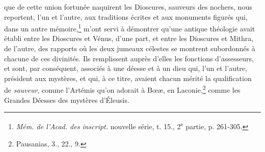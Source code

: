 \documentclass{article}
\begin{document}
que de cette union fortunée naquirent les Dioscures, sauveurs des nochers, nous reportent, l'un et l'autre, aux traditions écrites et aux monuments figurés qui, dans un autre mémoire,\footnote{\emph{Mém. de l'Acad. des inscript.} nouvelle série, t. 15., 2\textsuperscript{e} partie, p. 261-305.} m'ont servi à démontrer qu'une antique théologie avait établi entre les Dioscures et Vénus, d'une part, et entre les Dioscures et Mithra, de l'autre, des rapports où les deux jumeaux célestes se montrent subordonnés à chacune de ces divinités. Ils remplissent auprès d'elles les fonctions d'assesseurs, et sont, par conséquent, associés à une déesse et à un dieu qui, l'un et l'autre, président aux mystères, et qui, à ce titre, avaient chacun mérité la qualification de \emph{sauveur}, comme l'Artémis qu'on adorait à Bœæ, en Laconie,\footnote{Pausanias, 3., 22., 9.} comme les Grandes Déesses des mystères d'Éleusis.
\end{document}
